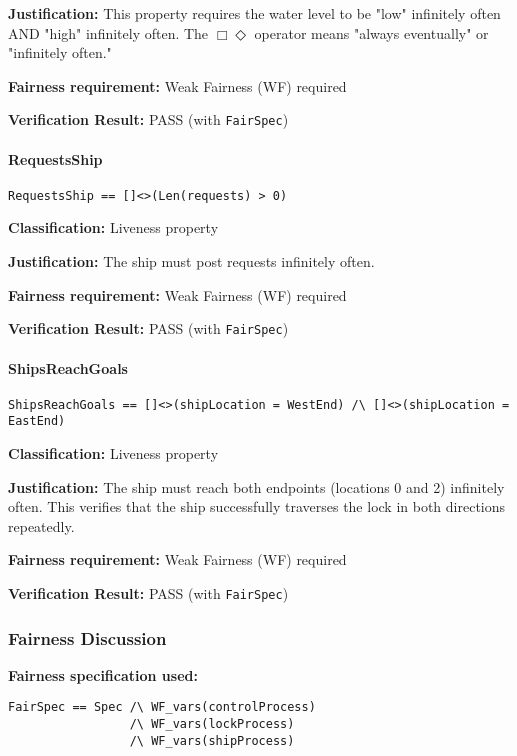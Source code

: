 \documentclass[12pt,a4paper]{article}
\begin{document}
\textbf{Justification:} This property requires the water level to be "low" infinitely often AND "high" infinitely often. The $\Box\Diamond$ operator means "always eventually" or "infinitely often."

\textbf{Fairness requirement:} Weak Fairness (WF) required

\textbf{Verification Result:} \checkmark{} PASS (with \texttt{FairSpec})

\paragraph{RequestsShip}
\begin{lstlisting}[style=tlaplus]
RequestsShip == []<>(Len(requests) > 0)
\end{lstlisting}

\textbf{Classification:} Liveness property

\textbf{Justification:} The ship must post requests infinitely often.

\textbf{Fairness requirement:} Weak Fairness (WF) required

\textbf{Verification Result:} \checkmark{} PASS (with \texttt{FairSpec})

\paragraph{ShipsReachGoals}
\begin{lstlisting}[style=tlaplus]
ShipsReachGoals == []<>(shipLocation = WestEnd) /\ []<>(shipLocation = EastEnd)
\end{lstlisting}

\textbf{Classification:} Liveness property

\textbf{Justification:} The ship must reach both endpoints (locations 0 and 2) infinitely often. This verifies that the ship successfully traverses the lock in both directions repeatedly.

\textbf{Fairness requirement:} Weak Fairness (WF) required

\textbf{Verification Result:} \checkmark{} PASS (with \texttt{FairSpec})

\subsubsection{Fairness Discussion}

\textbf{Fairness specification used:}
\begin{lstlisting}[style=tlaplus]
FairSpec == Spec /\ WF_vars(controlProcess) 
                 /\ WF_vars(lockProcess) 
                 /\ WF_vars(shipProcess)
\end{lstlisting}
\end{document}
